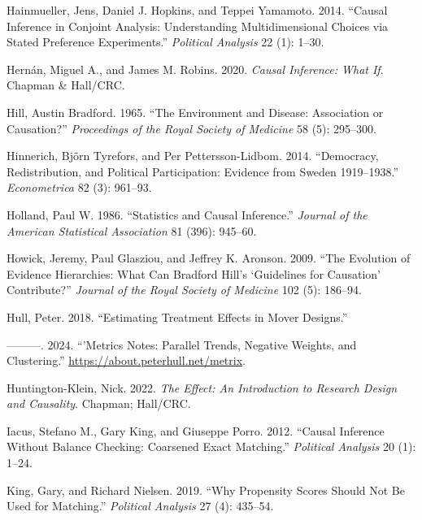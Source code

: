 \documentclass[
]{article}
\newlength{\cslhangindent}
\newenvironment{CSLReferences}[2] %
 {\begin{list}{}{%
  \setlength{\itemindent}{0pt}
  \setlength{\leftmargin}{0pt}
  \setlength{\parsep}{0pt}
  \ifodd #1
   \setlength{\leftmargin}{\cslhangindent}
   \setlength{\itemindent}{-1\cslhangindent}
  \fi
  \setlength{\itemsep}{#2\baselineskip}}}
 {\end{list}}
\begin{document}
\begin{CSLReferences}{1}{0}
Hainmueller, Jens, Daniel J. Hopkins, and Teppei Yamamoto. 2014. {``Causal Inference in Conjoint Analysis: Understanding Multidimensional Choices via Stated Preference Experiments.''} \emph{Political Analysis} 22 (1): 1--30.

Hernán, Miguel A., and James M. Robins. 2020. \emph{Causal Inference: {What If}}. Chapman \& Hall/CRC.

Hill, Austin Bradford. 1965. {``The Environment and Disease: Association or Causation?''} \emph{Proceedings of the Royal Society of Medicine} 58 (5): 295--300.

Hinnerich, Björn Tyrefors, and Per Pettersson-Lidbom. 2014. {``Democracy, Redistribution, and Political Participation: Evidence from {Sweden} 1919--1938.''} \emph{Econometrica} 82 (3): 961--93.

Holland, Paul W. 1986. {``Statistics and Causal Inference.''} \emph{Journal of the American Statistical Association} 81 (396): 945--60.

Howick, Jeremy, Paul Glasziou, and Jeffrey K. Aronson. 2009. {``The Evolution of Evidence Hierarchies: What Can {Bradford Hill's} {`Guidelines for Causation'} Contribute?''} \emph{Journal of the Royal Society of Medicine} 102 (5): 186--94.

Hull, Peter. 2018. {``Estimating Treatment Effects in Mover Designs.''}

---------. 2024. {``'Metrics Notes: Parallel Trends, Negative Weights, and Clustering.''} \url{https://about.peterhull.net/metrix}.

Huntington-Klein, Nick. 2022. \emph{The Effect: An Introduction to Research Design and Causality}. Chapman; Hall/CRC.

Iacus, Stefano M., Gary King, and Giuseppe Porro. 2012. {``Causal Inference Without Balance Checking: Coarsened Exact Matching.''} \emph{Political Analysis} 20 (1): 1--24.

King, Gary, and Richard Nielsen. 2019. {``Why Propensity Scores Should Not Be Used for Matching.''} \emph{Political Analysis} 27 (4): 435--54.


\end{CSLReferences}
\end{document}
